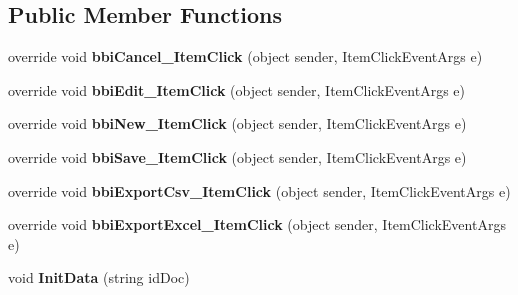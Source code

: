 \subsection*{Public Member Functions}
\begin{DoxyCompactItemize}
\item 
\mbox{\label{class_h_k_supply_1_1_forms_1_1_supply_1_1_packing_list_bcn_adc2970e02074214b4bd1724a9613954c}} 
override void {\bfseries bbi\+Cancel\+\_\+\+Item\+Click} (object sender, Item\+Click\+Event\+Args e)
\item 
\mbox{\label{class_h_k_supply_1_1_forms_1_1_supply_1_1_packing_list_bcn_a680a64bd464e687546e533afa81e3ec4}} 
override void {\bfseries bbi\+Edit\+\_\+\+Item\+Click} (object sender, Item\+Click\+Event\+Args e)
\item 
\mbox{\label{class_h_k_supply_1_1_forms_1_1_supply_1_1_packing_list_bcn_addced1a4040cc74f344362048734c337}} 
override void {\bfseries bbi\+New\+\_\+\+Item\+Click} (object sender, Item\+Click\+Event\+Args e)
\item 
\mbox{\label{class_h_k_supply_1_1_forms_1_1_supply_1_1_packing_list_bcn_a1211f027782b72965e8e80f48dfdb66a}} 
override void {\bfseries bbi\+Save\+\_\+\+Item\+Click} (object sender, Item\+Click\+Event\+Args e)
\item 
\mbox{\label{class_h_k_supply_1_1_forms_1_1_supply_1_1_packing_list_bcn_ac37c646f635c9c25bc7e25ff2a673757}} 
override void {\bfseries bbi\+Export\+Csv\+\_\+\+Item\+Click} (object sender, Item\+Click\+Event\+Args e)
\item 
\mbox{\label{class_h_k_supply_1_1_forms_1_1_supply_1_1_packing_list_bcn_a62a7f563e1088a4702f4688927f61993}} 
override void {\bfseries bbi\+Export\+Excel\+\_\+\+Item\+Click} (object sender, Item\+Click\+Event\+Args e)
\item 
\mbox{\label{class_h_k_supply_1_1_forms_1_1_supply_1_1_packing_list_bcn_ad61f82aff151461d172d0d04c20dc7a5}} 
void {\bfseries Init\+Data} (string id\+Doc)
\end{DoxyCompactItemize}
